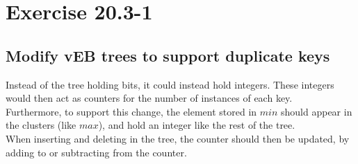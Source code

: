 \section*{Exercise 20.3-1}
\subsection*{Modify vEB trees to support duplicate keys}

Instead of the tree holding bits, it could instead hold integers. These integers would then act as counters for the number of instances of each key.
\\
Furthermore, to support this change, the element stored in $min$ should appear in the clusters (like $max$), and hold an integer like the rest of the tree.
\\
When inserting and deleting in the tree, the counter should then be updated, by adding to or subtracting from the counter.